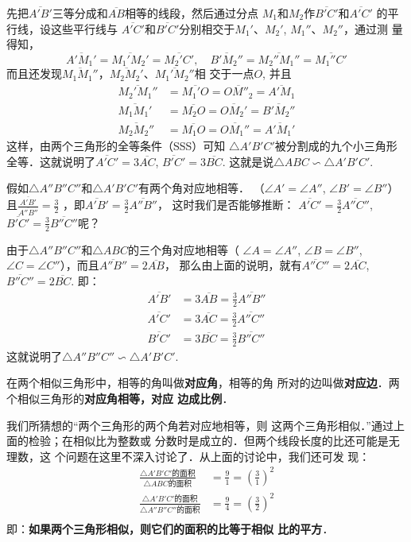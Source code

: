 先把$\overline{A'B'}$三等分成和$\overline{AB}$相等的线段，然后通过分点
${M_1}$和$M_2$作$\overline{B'C'}$和$\overline{A'C'}$
的平行线，设这些平行线与
$\overline{A'C'}$和$\overline{B'C'}$分别相交于$M_1'$、$M_2'$, $M_1''$、$M_2''$，通过测
量得知，
\[\overline{A'M_1'}=\overline{M_1'M_2'}=\overline{M_2'C'},\quad \overline{B'M_2''}=\overline{M_2''M_1''}
=\overline{M_1''C'}\]
而且还发现$\overline{M_1M_1''}$，$\overline{M_2M_2'}$、$\overline{M_1'M_2''}$相
交于一点$O$, 并且
\[\begin{split}
	\overline{M_2'M_1''}&=\overline{M_1'O}=\overline{OM''_2}=\overline{A'M_1}\\
	\overline{M_1M_1'}&=\overline{M_2O}=\overline{OM_2'}=\overline{B'M_2''}\\
	\overline{M_2M_2''}&=\overline{M_1O}=\overline{OM_1''}=\overline{A'M_1'}
\end{split}\]
这样，由两个三角形的全等条件（SSS）可知
$\triangle A'B'C'$被分割成的九个小三角形全等．这就说明了$\overline{A'C'}=3\overline{AC}$, $\overline{B'C'}=3\overline{BC}$. 这就是说$\triangle ABC\backsim \triangle A'B'C'$.

假如$\triangle A''B''C''$和$\triangle A'B'C'$有两个角对应地相等．
（$\angle A'=\angle A''$, $\angle B'=\angle B''$）
且$\frac{\overline{A'B'}}{\overline{A''B''}}=\frac{3}{2}$
，即$\overline{A'B'}=\frac{3}{2}\overline{A''B''}$，
这时我们是否能够推断：
$\overline{A'C'}=\frac{3}{2}\overline{A''C''}$, $\overline{B'C'}=\frac{3}{2}\overline{B''C''}$呢？

由于$\triangle A''B''C''$和$\triangle ABC$的三个角对应地相等（
$\angle A=\angle A''$, $\angle B=\angle B''$, $\angle C=\angle C''$），而且$\overline{A''B''}=2\overline{AB}$，
那么由上面的说明，就有$\overline{A''C''}=2\overline{AC}$, $\overline{B''C''}=2\overline{BC}$. 
即：
\[\begin{split}
	\overline{A'B'}&=3\overline{AB}=\frac{3}{2}\overline{A''B''}\\
	\overline{A'C'}&=3\overline{AC}=\frac{3}{2}\overline{A''C''}\\
 \overline{B'C'}&=3\overline{BC}=\frac{3}{2}\overline{B''C''}
\end{split}
	\]
这就说明了$\triangle A''B''C''\backsim \triangle A'B'C'$.

在两个相似三角形中，相等的角叫做\textbf{对应角}，相等的角
所对的边叫做\textbf{对应边}．两个相似三角形的\textbf{对应角相等，对应
边成比例}．

我们所猜想的“两个三角形的两个角若对应地相等，则
这两个三角形相似．”通过上面的检验；在相似比为整数或
分数时是成立的．但两个线段长度的比还可能是无理数，这
个问题在这里不深入讨论了．从上面的讨论中，我们还可发
现：
\[\begin{split}
	\frac{\triangle A'B'C'\text{的面积} }{\triangle ABC\text{的面积}}&=\frac{9}{1}=\left(\frac{3}{1}\right)^2\\
	\frac{\triangle A'B'C'\text{的面积} }{\triangle A''B''C''\text{的面积}}&=\frac{9}{4}=\left(\frac{3}{2}\right)^2\\
\end{split}\]
即：\textbf{如果两个三角形相似，则它们的面积的比等于相似
比的平方}．


